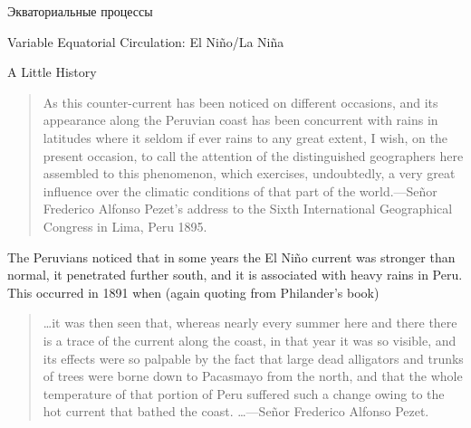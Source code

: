 \begin{chapter}{Экваториальные процессы}
\begin{section}{Variable Equatorial Circulation: El Ni\~{n}o/La Ni\~{n}a}
\begin{paragraph}{A Little History}
\begin{quotation}
As this counter-current has been noticed on different occasions, and
its appearance along the Peruvian coast has been concurrent with rains
in latitudes where it seldom if ever rains to any great extent, I
wish, on the present occasion, to call the attention of the
distinguished geographers here assembled to this phenomenon, which
exercises, undoubtedly, a very great influence over the climatic
conditions of that part of the world.---Se\~{n}or Frederico Alfonso
Pezet's address to the Sixth International Geographical Congress in
Lima, Peru 1895.
%
\end{quotation}

The Peruvians noticed that in some years the El Ni\~{n}o current was
stronger than normal, it penetrated further south, and it is
associated with heavy rains in Peru. This occurred in 1891 when (again
quoting from Philander's book)
%
\begin{quotation}
\ldots it was then seen that, whereas nearly every summer here and
there there is a trace of the current along the coast, in that year it
was so visible, and its effects were so palpable by the fact that
large dead alligators and trunks of trees were borne down to Pacasmayo
from the north, and that the whole temperature of that portion of Peru
suffered such a change owing to the hot current that bathed the
coast. \ldots ---Se\~{n}or Frederico Alfonso Pezet.
%


\end{quotation}
\end{paragraph}
\end{section}
\end{chapter}
